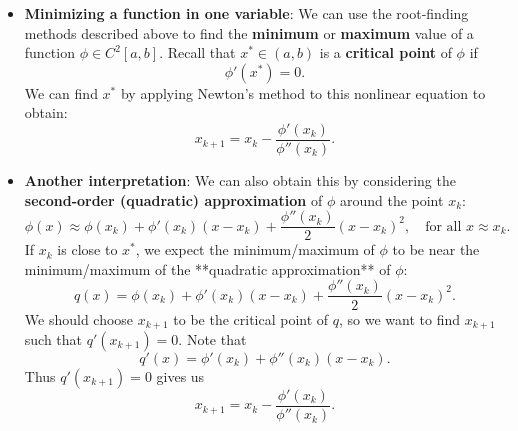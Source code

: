 \documentclass{report}
\begin{document}
\begin{itemize}
\item \textbf{Minimizing a function in one variable}:
    We can use the root-finding methods described above to find the \textbf{minimum} or \textbf{maximum} value of a function $\phi \in C^2[a,b]$.
    Recall that $x^* \in (a,b)$ is a \textbf{critical point} of $\phi$ if 
    $$\phi'(x^*) = 0.$$
    We can find $x^*$ by applying Newton's method to this nonlinear equation to obtain:
    $$x_{k+1} = x_k - \frac{\phi'(x_k)}{\phi''(x_k)}.$$
\item \textbf{Another interpretation}:
    We can also obtain this by considering the \textbf{second-order (quadratic) approximation} of $\phi$ around the point $x_k$:
    $$\phi(x) \approx \phi(x_k) + \phi'(x_k)(x-x_k) + \frac{\phi''(x_k)}{2}(x-x_k)^2, \quad \text{for all $x \approx x_k$}.$$
    If $x_k$ is close to $x^*$, we expect the minimum/maximum of $\phi$ to be near the minimum/maximum of the **quadratic approximation** of $\phi$:
    $$q(x) = \phi(x_k) + \phi'(x_k)(x-x_k) + \frac{\phi''(x_k)}{2}(x-x_k)^2.$$
    We should choose $x_{k+1}$ to be the critical point of $q$, so we want to find $x_{k+1}$ such that $q'(x_{k+1}) = 0$. Note that
    $$q'(x) = \phi'(x_k) + \phi''(x_k)(x-x_k).$$
    Thus $q'(x_{k+1}) = 0$ gives us
    $$x_{k+1} = x_k - \frac{\phi'(x_k)}{\phi''(x_k)}.$$










    \end{itemize}

    \pagebreak 
\end{document}
